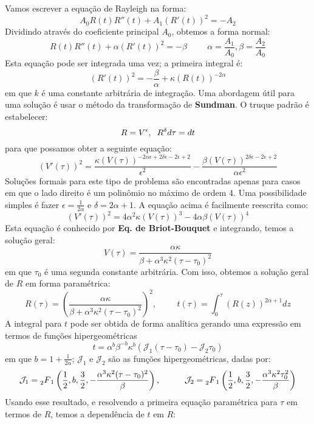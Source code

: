 \documentclass[10pt,a4paper]{article}
\begin{document}
	Vamos escrever a equação de Rayleigh na forma: \[A_0R(t)R''(t)+A_1(R'(t))^2 = -A_2\]
	Dividindo através do coeficiente principal $A_0$, obtemos a forma normal: \[R(t)R''(t)+\alpha(R'(t))^2 = -\beta\hspace{1cm}\alpha=\frac{A_1}{A_0},\beta=\frac{A_2}{A_0}\]
	Esta equação pode ser integrada uma vez; a primeira integral é:
	\begin{equation}
		(R'(t))^2 = -\frac{\beta}{\alpha} + \kappa(R(t))^{-2\alpha}
		\label{eq:1}
	\end{equation}
	em que $k$ é uma constante arbitrária de integração. Uma abordagem útil para uma solução é usar o método da transformação de \textbf{Sundman}. O truque padrão é estabelecer:
	\[R = V^\epsilon, \hspace{0.2cm} R^\delta d\tau = dt\]
	para que possamos obter a seguinte equação:
	\[(V'(\tau))^2 = \frac{\kappa(V(\tau))^{-2\alpha\epsilon+2\delta\epsilon-2\epsilon+2}}{\epsilon^2} - \frac{\beta(V(\tau))^{2\delta\epsilon-2\epsilon+2}}{\alpha\epsilon^2}\]
	Soluções formais para este tipo de problema são encontradas apenas para casos em que o lado direito é um polinômio no máximo de ordem 4. Uma possibilidade simples é fazer $\epsilon=\frac{1}{2\alpha}$ e $\delta=2\alpha+1$. A equação acima é facilmente reescrita como:
	\[(V'(\tau))^2 = 4\alpha^2\kappa(V(\tau))^3 - 4\alpha\beta(V(\tau))^4\]
	Esta equação é conhecido por \textbf{Eq. de Briot-Bouquet} e integrando, temos a solução geral:
	\[V(\tau) = \frac{\alpha\kappa}{\beta+\alpha^3\kappa^2(\tau-\tau_0)^2}\]
	em que $\tau_0$ é uma segunda constante arbitrária. Com isso, obtemos a solução geral de $R$ em forma paramétrica:
	\[R(\tau) = \left(\frac{\alpha\kappa}{\beta+\alpha^3\kappa^2(\tau-\tau_0)^2}\right)^2, \hspace{1cm} t(\tau) = \int_0^\tau{(R(z))^{2\alpha+1} dz}\]
	A integral para $t$ pode ser obtida de forma analítica gerando uma expressão em termos de funções hipergeométricas
	\[t=\alpha^b\beta^{-b}\kappa^b\left(\mathcal{J}_1(\tau-\tau_0) - \mathcal{J}_2\tau_0\right)\]
	em que $b=1+\frac{1}{2\alpha}$; $\mathcal{J}_1$ e $\mathcal{J}_2$ são as funções hipergeométricas, dadas por:
	\[\mathcal{J}_1 = \prescript{}{2}{F}_1\left(\frac{1}{2}, b, \frac{3}{2}, -\frac{\alpha^3\kappa^2(\tau-\tau_0)^2}{\beta}\right), \hspace{1cm} \mathcal{J}_2 = \prescript{}{2}{F}_1\left(\frac{1}{2}, b, \frac{3}{2}, -\frac{\alpha^3\kappa^2\tau_0^2}{\beta}\right)\]
	Usando esse resultado, e resolvendo a primeira equação paramétrica para $\tau$ em termos de $R$, temos a dependência de $t$ em $R$:
\end{document}
